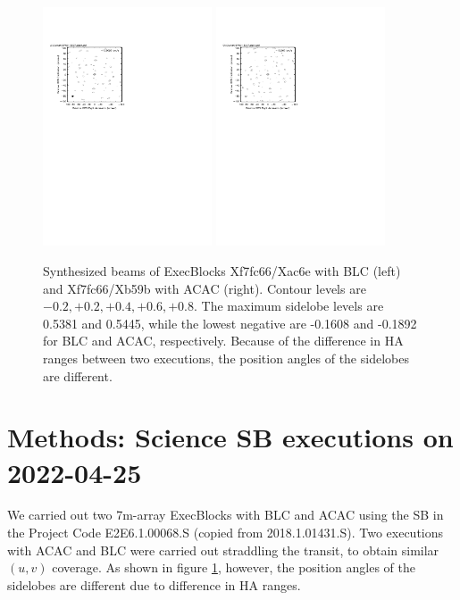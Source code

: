 \documentclass[a4paper, 10pt]{scrartcl}
\begin{document}
\begin{figure}[h]
	\centering
	\includegraphics[width=5cm]{BLC-beam.pdf} \includegraphics[width=5cm]{ACA-beam.pdf}
	\caption{Synthesized beams of ExecBlocks Xf7fc66/Xac6e with BLC (left) and Xf7fc66/Xb59b with ACAC (right). Contour levels are $-0.2, +0.2, +0.4, +0.6, +0.8$. The maximum sidelobe levels are 0.5381 and 0.5445, while the lowest negative are -0.1608 and -0.1892 for BLC and ACAC, respectively. Because of the difference in HA ranges between two executions, the position angles of the sidelobes are different.}\label{fig:PSF}
\end{figure}


\section{Methods: Science SB executions on 2022-04-25}
We carried out two 7m-array ExecBlocks with BLC and ACAC using the SB in the Project Code E2E6.1.00068.S (copied from 2018.1.01431.S).
Two executions with ACAC and BLC were carried out straddling the transit, to obtain similar $(u,v)$ coverage.
As shown in figure \ref{fig:PSF}, however, the position angles of the sidelobes are different due to difference in HA ranges.
\end{document}
